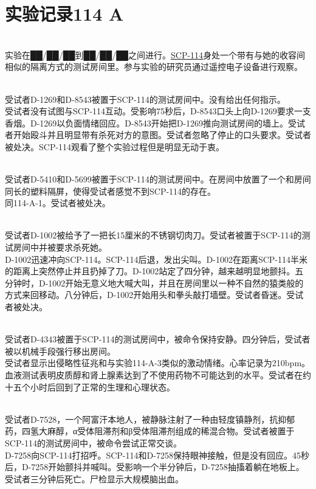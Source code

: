 \section{实验记录114 A}

\label{sec:DOC-experiment-log-114-a}

\\
实验在██\slash ██\slash ██到██\slash ██\slash ██之间进行。\hyperref[chap:SCP-114]{SCP-114}身处一个带有与她的收容间相似的隔离方式的测试房间里。参与实验的研究员通过遥控电子设备进行观察。

\begin{scpbox}

\\
受试者D-1269和D-8543被置于SCP-114的测试房间中。没有给出任何指示。\\
受试者没有试图与SCP-114互动。受影响75秒后，D-8543口头上向D-1269要求一支香烟。D-1269以负面情绪回应。D-8543开始把D-1269推向测试房间的墙上。受试者开始殴斗并且明显带有杀死对方的意图。受试者忽略了停止的口头要求。受试者被处决。SCP-114观看了整个实验过程但是明显无动于衷。

\\
受试者D-5410和D-5699被置于SCP-114的测试房间中。在房间中放置了一个和房间同长的塑料隔屏，使得受试者感觉不到SCP-114的存在。\\
同114-A-1。受试者被处决。

\\
受试者D-1002被给予了一把长15厘米的不锈钢切肉刀。受试者被置于SCP-114的测试房间中并被要求杀死她。\\
D-1002迅速冲向SCP-114。SCP-114后退，发出尖叫。D-1002在距离SCP-114半米的距离上突然停止并且扔掉了刀。D-1002站定了四分钟，越来越明显地颤抖。五分钟时，D-1002开始无意义地大喊大叫，并且在房间里以一种不自然的猿类般的方式来回移动。八分钟后，D-1002开始用头和拳头敲打墙壁。受试者昏迷。受试者被处决。

\\
受试者D-4343被置于SCP-114的测试房间中，被命令保持安静。四分钟后，受试者被以机械手段强行移出房间。\\
受试者显示出侵略性征兆和与实验114-A-3类似的激动情绪。心率记录为210bpm。血液测试表明皮质醇和肾上腺素达到了不使用药物不可能达到的水平。受试者在约十五个小时后回到了正常的生理和心理状态。

\\
受试者D-7528，一个阿富汗本地人，被静脉注射了一种由轻度镇静剂，抗抑郁药，四氢大麻醇，α受体阻滞剂和β受体阻滞剂组成的稀混合物。受试者被置于SCP-114的测试房间中，被命令尝试正常交谈。\\
D-7258向SCP-114打招呼。SCP-114和D-7258保持眼神接触，但是没有回应。45秒后，D-7258开始颤抖并喊叫。受影响一个半分钟后，D-7258抽搐着躺在地板上。受试者三分钟后死亡。尸检显示大规模脑出血。

\end{scpbox}
